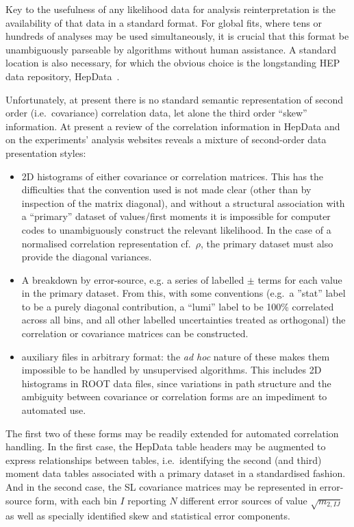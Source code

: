 \documentclass[11pt]{article}
\begin{document}
Key to the usefulness of any likelihood data for analysis reinterpretation is
the availability of that data in a standard format. For global fits, where tens
or hundreds of analyses may be used simultaneously, it is crucial that this
format be unambiguously parseable by algorithms without human assistance. A
standard location is also necessary, for which the obvious choice is the longstanding
HEP data repository, HepData~\cite{hepdata}.

Unfortunately, at present there is no standard semantic representation of second
order (i.e.~covariance) correlation data, let alone the third order ``skew''
information. At present a review of the correlation information in HepData and
on the experiments' analysis websites reveals a mixture of second-order data
presentation styles:
%
\begin{itemize}
\item 2D histograms of either covariance or correlation matrices. This has the
  difficulties that the convention used is not made clear (other than by
  inspection of the matrix diagonal), and without a structural association with
  a ``primary'' dataset of values/first moments it is impossible for computer
  codes to unambiguously construct the relevant likelihood. In the case of a
  normalised correlation representation cf.~$\rho$, the primary dataset must
  also provide the diagonal variances.
\item A breakdown by error-source, e.g. a series of labelled $\pm$ terms for
  each value in the primary dataset. From this, with some conventions (e.g.~a
  ''stat'' label to be a purely diagonal contribution, a ``lumi'' label to be
  100\% correlated across all bins, and all other labelled uncertainties treated
  as orthogonal) the correlation or covariance matrices can be constructed.
\item auxiliary files in arbitrary format: the \emph{ad hoc} nature of these
  makes them impossible to be handled by unsupervised algorithms. This includes
  2D histograms in ROOT data files, since variations in path structure and the
  ambiguity between covariance or correlation forms are an impediment to
  automated use.
\end{itemize}

The first two of these forms may be readily extended for automated correlation
handling. In the first case, the HepData table headers may be augmented to
express relationships between tables, i.e.~identifying the second (and third)
moment data tables associated with a primary dataset in a standardised
fashion. And in the second case, the SL covariance matrices may be represented
in error-source form, with each bin $I$ reporting $N$ different error sources of
value $\sqrt{m_{2,IJ}}$ as well as specially identified skew and statistical
error components.
\end{document}
